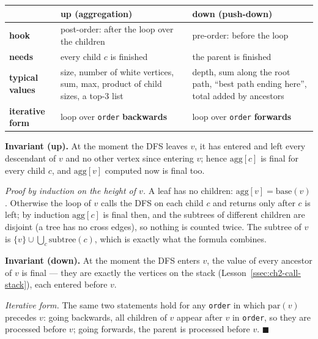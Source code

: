 \begin{center}
\small
\renewcommand{\arraystretch}{1.3}
\begin{tabularx}{\linewidth}{@{}>{\bfseries}l X X@{}}
\toprule
 & \textbf{up (aggregation)} & \textbf{down (push-down)} \\
\midrule
hook & post-order: after the loop over the children & pre-order: before the loop \\
needs & every child $c$ is finished & the parent is finished \\
typical values & size, number of white vertices, sum, max, product of child sizes, a top-3 list & depth, sum along the root path, ``best path ending here'', total added by ancestors \\
iterative form & loop over \texttt{order} \textbf{backwards} & loop over \texttt{order} \textbf{forwards} \\
\bottomrule
\end{tabularx}
\end{center}

\begin{invariantbox}
\textbf{Invariant (up).} At the moment the DFS leaves $v$, it has entered and left every descendant of $v$ and no other vertex since entering $v$; hence $\mathrm{agg}[c]$ is final for every child $c$, and $\mathrm{agg}[v]$ computed now is final too.

\emph{Proof by induction on the height of $v$.} A leaf has no children: $\mathrm{agg}[v] = \mathrm{base}(v)$. Otherwise the loop of $v$ calls the DFS on each child $c$ and returns only after $c$ is left; by induction $\mathrm{agg}[c]$ is final then, and the subtrees of different children are disjoint (a tree has no cross edges), so nothing is counted twice. The subtree of $v$ is $\{v\} \cup \bigcup_c \mathrm{subtree}(c)$, which is exactly what the formula combines.

\textbf{Invariant (down).} At the moment the DFS enters $v$, the value of every ancestor of $v$ is final --- they are exactly the vertices on the stack (Lesson~\ref{ssec:ch2-call-stack}), each entered before $v$.

\emph{Iterative form.} The same two statements hold for any \texttt{order} in which $\mathrm{par}(v)$ precedes $v$: going backwards, all children of $v$ appear after $v$ in \texttt{order}, so they are processed before $v$; going forwards, the parent is processed before $v$. \hfill$\blacksquare$
\end{invariantbox}

